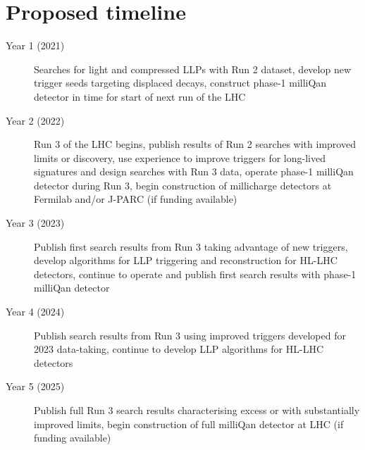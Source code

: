 \documentclass[11pt,twocolumn]{article}
\theoremstyle{plain} \numberwithin{equation}{section}
\theoremstyle{definition}
\begin{document}
\section*{Proposed timeline}
\begin{description}
\item[Year 1 (2021)]{Searches for light and compressed LLPs with Run 2 dataset, develop new trigger seeds
targeting displaced decays, construct phase-1 milliQan detector in time for start of next run of the LHC}
\item[Year 2 (2022)]{Run 3 of the LHC begins, publish results of Run 2 searches with improved limits or discovery, use experience to improve triggers for long-lived signatures and design searches with Run 3 data, operate phase-1 milliQan detector during Run 3, begin construction of millicharge detectors at Fermilab and/or J-PARC (if funding available)}
\item[Year 3 (2023)]{Publish first search results from Run 3 taking advantage of new triggers, develop algorithms for LLP triggering and reconstruction for HL-LHC detectors, continue to operate and publish first search results with phase-1 milliQan detector}
\item[Year 4 (2024)]{Publish search results from Run 3 using improved triggers developed for 2023 data-taking, continue to develop LLP algorithms for HL-LHC detectors}
\item[Year 5 (2025)]{Publish full Run 3 search results characterising excess or with substantially improved limits, begin construction of full milliQan detector at LHC (if funding available)}
\end{description}


\end{document}
